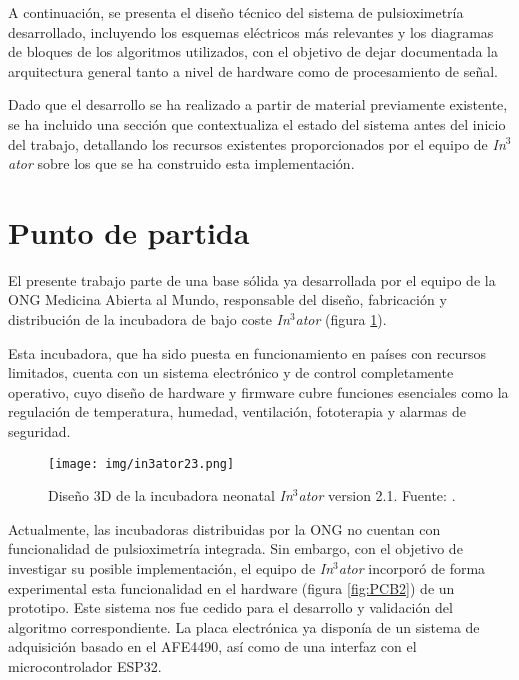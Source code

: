 
A continuación, se presenta el diseño técnico del sistema de pulsioximetría desarrollado, incluyendo los esquemas eléctricos más relevantes y los diagramas de bloques de los algoritmos utilizados, con el objetivo de dejar documentada la arquitectura general tanto a nivel de hardware como de procesamiento de señal. 

Dado que el desarrollo se ha realizado a partir de material previamente existente, se ha incluido una sección que contextualiza el estado del sistema antes del inicio del trabajo, detallando los recursos existentes proporcionados por el equipo de \textit{In$^3$ator} sobre los que se ha construido esta implementación.

\section{Punto de partida}

El presente trabajo parte de una base sólida ya desarrollada por el equipo de la ONG Medicina Abierta al Mundo, responsable del diseño, fabricación y distribución de la incubadora de bajo coste \textit{In$^3$ator} (figura \ref{fig:in3ator23}). 

Esta incubadora, que ha sido puesta en funcionamiento en países con recursos limitados, cuenta con un sistema electrónico y de control completamente operativo, cuyo diseño de hardware y firmware cubre funciones esenciales como la regulación de temperatura, humedad, ventilación, fototerapia y alarmas de seguridad.

\begin{figure}[H]
    \centering
    \texttt{[image: img/in3ator23.png]}
    \caption{Diseño 3D de la incubadora neonatal \textit{In$^3$ator} version 2.1. Fuente: \cite{in3ator2023manual}.}
    \label{fig:in3ator23}
\end{figure}

Actualmente, las incubadoras distribuidas por la ONG no cuentan con funcionalidad de pulsioximetría integrada. Sin embargo, con el objetivo de investigar su posible implementación, el equipo de \textit{In$^3$ator} incorporó de forma experimental esta funcionalidad en el hardware (figura \ref{fig:PCB2}) de un prototipo. Este sistema nos fue cedido para el desarrollo y validación del algoritmo correspondiente. La placa electrónica ya disponía de un sistema de adquisición basado en el AFE4490, así como de una interfaz con el microcontrolador ESP32. 

